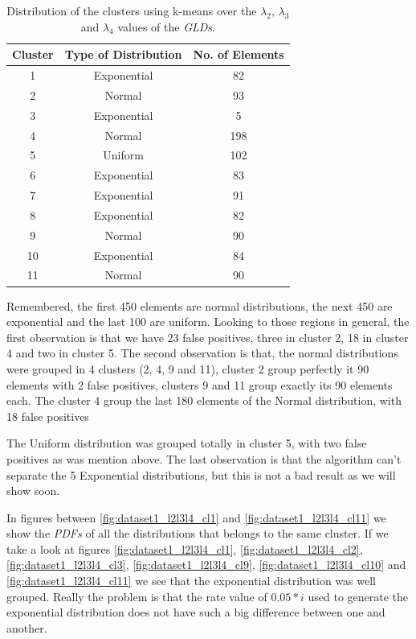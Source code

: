 \begin{table}[]
\centering
\caption{Distribution of the clusters using k-means over the $\lambda_{2}$, $\lambda_{3}$ and $\lambda_{4}$ values of the \textit{GLDs}.}
\label{tab:dataset1_l2l3l4}
\begin{tabular}{|c|c|c|}
\hline
Cluster & Type of Distribution & No. of Elements \\ \hline
1       & Exponential          & 82              \\ \hline
2       & Normal          & 93              \\ \hline
3       & Exponential          & 5             \\ \hline
4       & Normal               & 198              \\ \hline
5       & Uniform               & 102              \\ \hline
6       & Exponential               & 83             \\ \hline
7       & Exponential              & 91             \\ \hline
8       & Exponential          & 82              \\ \hline
9       & Normal          & 90               \\ \hline
10      & Exponential               & 84              \\ \hline
11      & Normal          & 90              \\ \hline
\end{tabular}
\end{table}

Remembered, the first 450 elements are normal distributions, the next 450 are exponential and the last 100 are uniform. Looking to those regions in general, the first observation is that we have 23 false positives, three in cluster 2, 18 in cluster 4 and two in cluster 5. The second observation is that, the normal distributions were grouped in 4 clusters (2, 4, 9 and 11), cluster 2 group perfectly it 90 elements with 2 false positives, clusters 9 and 11 group exactly its 90 elements each. The cluster 4 group the last 180 elements of the Normal distribution, with 18 false positives

The Uniform distribution was grouped totally in cluster 5, with two false positives as was mention above. The last observation is that the algorithm can't separate the 5 Exponential distributions, but this is not a bad result as we will show soon. 

In figures between \ref{fig:dataset1_l2l3l4_cl1} and \ref{fig:dataset1_l2l3l4_cl11} we show the \textit{PDFs} of all the distributions that belongs to the same cluster. If we take a look at figures \ref{fig:dataset1_l2l3l4_cl1}, \ref{fig:dataset1_l2l3l4_cl2}, \ref{fig:dataset1_l2l3l4_cl3}, \ref{fig:dataset1_l2l3l4_cl9}, \ref{fig:dataset1_l2l3l4_cl10} and \ref{fig:dataset1_l2l3l4_cl11} we see that the exponential distribution was well grouped. Really the problem is that the rate value of $0.05*i$ used to generate the exponential distribution does not have such a big difference between one and another.  


